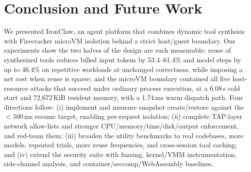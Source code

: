 \documentclass[conference]{IEEEtran}
\newcommand{\toolname}{IronClaw}
\begin{document}
\section{Conclusion and Future Work}
\label{sec:conclusion}

We presented \toolname{}, an agent platform that combines dynamic tool
synthesis with Firecracker microVM isolation behind a strict host/guest
boundary. Our experiments show the two halves of the design are each
measurable: reuse of synthesized tools reduces billed input tokens by
53.4--61.4\% and model steps by up to 46.4\% on repetitive workloads at
unchanged correctness, while imposing a net cost when reuse is sparse; and the
microVM boundary contained all five host-resource attacks that succeed under
ordinary process execution, at a 6.08\,s cold start and 72{,}672\,KiB resident
memory, with a 1.74\,ms warm dispatch path. Four directions follow: (i)
implement and measure snapshot create/restore against the ${<}500$\,ms resume
target, enabling per-request isolation; (ii) complete TAP-layer network
allow-lists and stronger CPU/memory/time/disk/output enforcement, and red-team
them; (iii) broaden the utility benchmarks to real codebases, more models,
repeated trials, more reuse frequencies, and cross-session tool caching; and
(iv) extend the security suite with fuzzing, kernel/VMM instrumentation,
side-channel analysis, and container/seccomp/WebAssembly baselines.



\end{document}
